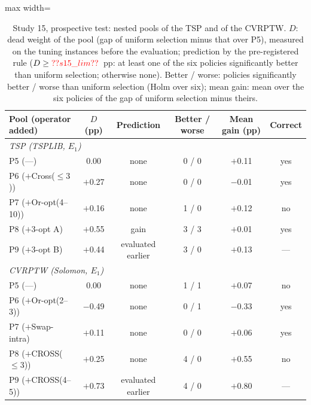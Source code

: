 \begin{table}[t]
\caption{Study 15, prospective test: nested pools of the TSP and of the CVRPTW. $D$: dead weight of the pool (gap of uniform selection minus that over P5), measured on the tuning instances before the evaluation; prediction by the pre-registered rule ($D\ge\num{s15_lim}$~pp: at least one of the six policies significantly better than uniform selection; otherwise none). Better / worse: policies significantly better / worse than uniform selection (Holm over six); mean gain: mean over the six policies of the gap of uniform selection minus theirs.}\label{tab:s15}
\centering
\small
\begin{adjustbox}{max width=\linewidth}
\begin{tabular}{lccccc}
\toprule
Pool (operator added) & $D$ (pp) & Prediction & Better / worse & Mean gain (pp) & Correct \\
\midrule
\multicolumn{6}{l}{\emph{TSP (TSPLIB, $E_1$)}} \\
P5 (---) & 0.00 & none & 0 / 0 & $+$0.11 & yes \\
P6 ($+$Cross($\le3$)) & $+$0.27 & none & 0 / 0 & $-$0.01 & yes \\
P7 ($+$Or-opt(4--10)) & $+$0.16 & none & 1 / 0 & $+$0.12 & no \\
P8 ($+$3-opt A) & $+$0.55 & gain & 3 / 3 & $+$0.01 & yes \\
P9 ($+$3-opt B) & $+$0.44 & evaluated earlier & 3 / 0 & $+$0.13 & --- \\
\multicolumn{6}{l}{\emph{CVRPTW (Solomon, $E_1$)}} \\
P5 (---) & 0.00 & none & 1 / 1 & $+$0.07 & no \\
P6 ($+$Or-opt(2--3)) & $-$0.49 & none & 0 / 1 & $-$0.33 & yes \\
P7 ($+$Swap-intra) & $+$0.11 & none & 0 / 0 & $+$0.06 & yes \\
P8 ($+$CROSS($\le3$)) & $+$0.25 & none & 4 / 0 & $+$0.55 & no \\
P9 ($+$CROSS(4--5)) & $+$0.73 & evaluated earlier & 4 / 0 & $+$0.80 & --- \\
\bottomrule
\end{tabular}
\end{adjustbox}
\end{table}
